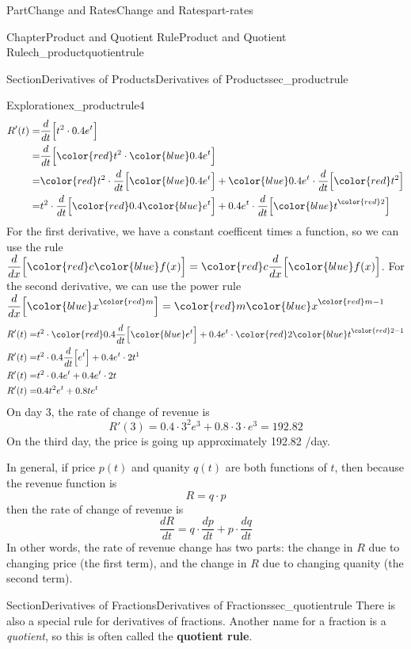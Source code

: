 \documentclass[oneside,10pt,]{tufte-book}
\newcommand{\terminology}[1]{\textbf{#1}}
\numberwithin{equation}{chapter}
\newcommand{\red}[1]{   {\color{red}   #1}   }
\newcommand{\blue}[1]{  {\color{blue}  #1}  }
\newcommand{\ddx}[1]{ \dfrac{d}{dx} \Big[ #1 \Big]  }
\newcommand{\ddt}[1]{ \dfrac{d}{dt} \Big[ #1 \Big]  }
\newcommand{\amp}{&}
\begin{document}
\begin{partptx}{Part}{Change and Rates}{}{Change and Rates}{}{}{part-rates}
\begin{chapterptx}{Chapter}{Product and Quotient Rule}{}{Product and Quotient Rule}{}{}{ch_productquotientrule}
\begin{sectionptx}{Section}{Derivatives of Products}{}{Derivatives of Products}{}{}{sec_productrule}
\begin{exploration}{Exploration}{}{ex_productrule4}
\begin{align*}
R'(t) = \amp \ddt{ t^2\cdot 0.4e^t } \\
= \amp \ddt{ \red{t^2}\cdot \blue{0.4e^t} } \\
= \amp \red{t^2}\cdot\ddt{  \blue{0.4e^t} } + \blue{0.4e^t}\cdot \ddt{ \red{t^2} }  \\
= \amp t^2\cdot\ddt{  \red{0.4}\blue{e^t} } + 0.4e^t \cdot \ddt{ \blue{t}^{\red{2}} }  
\end{align*}
For the first derivative, we have a constant coefficent times a function, so we can use the rule \(\ddx{\red{c}\blue{f(x)}} = \red{c} \ddx{\blue{f(x)} }\). For the second derivative, we can use the power rule \(\ddx{\blue{x}^{\red{m}}} = \red{m} \blue{x}^{\red{m}-1}\)%
\begin{align*}
R'(t) = \amp t^2\cdot \red{0.4}\ddt{ \blue{e^t} } + 0.4e^t \cdot \red{2} \blue{t}^{\red{2}-1}   \\
R'(t) = \amp t^2\cdot 0.4 \ddt{ e^t } + 0.4e^t \cdot 2 t^{1}   \\
R'(t) = \amp t^2\cdot 0.4 e^t  + 0.4e^t \cdot 2 t   \\
R'(t) = \amp 0.4 t^2 e^t  + 0.8 t e^t   
\end{align*}
On day \(3\), the rate of change of revenue is%
\begin{equation*}
R'(3) = 0.4 \cdot 3^2 e^3  + 0.8\cdot  3 \cdot e^3 = 192.82
\end{equation*}
On the third day, the price is going up approximately 192.82 \textdollar{}\slash{}day.%
\end{exploration}%
In general, if price \(p(t)\) and quanity \(q(t)\) are both functions of \(t\), then because the revenue function is%
\begin{equation*}
R = q\cdot p
\end{equation*}
then the rate of change of revenue is%
\begin{equation*}
\frac{dR}{dt} = q\cdot \frac{dp}{dt} + p \cdot \frac{dq}{dt}
\end{equation*}
In other words, the rate of revenue change has two parts: the change in \(R\) due to changing price (the first term), and the change in \(R\) due to changing quanity (the second term).%
\end{sectionptx}
%
%
\typeout{************************************************}
\typeout{************************************************}
%
\begin{sectionptx}{Section}{Derivatives of Fractions}{}{Derivatives of Fractions}{}{}{sec_quotientrule}
There is also a special rule for derivatives of fractions. Another name for a fraction is a \emph{quotient}, so this is often called the \terminology{quotient rule}.%

\end{sectionptx}
\end{chapterptx}
\end{partptx}
\end{document}
